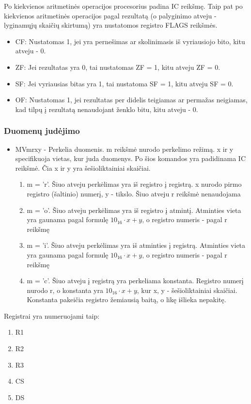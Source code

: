 \documentclass{VUMIFInfKursinis}
\begin{document}
Po kiekvienos aritmetinės operacijos procesorius padina IC reikšmę. Taip pat po kiekvienos aritmetinės operacijos pagal rezultatą (o palyginimo atveju - lyginamųjų skaičių skirtumą) yra nustatomos registro FLAGS reikšmės.

\begin{itemize}
	\item CF: Nustatomas 1, jei yra pernešimas ar skolinimasis iš vyriausiojo bito, kitu atveju - 0.
	\item ZF: Jei rezultatas yra 0, tai nustatomas ZF = 1, kitu atveju ZF = 0.
	\item SF: Jei vyriausias bitas yra 1, tai nustatoma SF = 1, kitu atveju SF = 0.
	\item OF: Nustatomas 1, jei rezultatas per didelis teigiamas ar permažas neigiamas, kad tilpų į rezultatą nenaudojant ženklo bitu, kitu atveju - 0.
\end{itemize}

\subsubsection{Duomenų judėjimo}
\begin{itemize}
	\item MVmrxy - Perkelia duomenis. m reikšmė nurodo perkelimo režimą. x ir y specifikuoja vietas, kur juda duomenys. Po šios komandos yra padidinama IC reikšmė. Čia x ir y yra šešioliktainiai skaičiai.
	\begin{enumerate}
		\item m = 'r'. Šiuo atveju perkėlimas yra iš registro į registrą. x nurodo pirmo registro (šaltinio) numerį, y - tikslo. Šiuo atveju r reikšmė nenaudojama
		\item m = 'o'. Šiuo atveju perkėlimas yra iš registro į atmintį. Atminties vieta yra gaunama pagal formulę $10_{16} \cdot x + y$, o registro numeris - pagal r reikšmę
		\item m = 'i'. Šiuo atveju perkėlimas yra iš atminties į registrą. Atminties vieta yra gaunama pagal formulę $10_{16} \cdot x + y$, o registro numeris - pagal r reikšmę
		\item m = 'c'. Šiuo atveju į registrą yra perkeliama konstanta. Registro numerį nurodo r, o konstanta yra $10_{16} \cdot x + y$, kur x, y - šešioliktainiai skaičiai. Konstanta pakeičia registro žemiausią baitą, o likę išlieka nepakitę.
	\end{enumerate}
\end{itemize}


Registrai yra numeruojami taip:
\begin{enumerate}
	\item R1
	\item R2
	\item R3
	\item CS
	\item DS
\end{enumerate}
\end{document}

